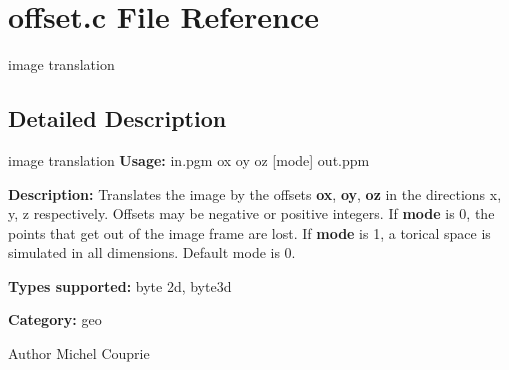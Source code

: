\section{offset.c File Reference}
\label{offset_8c}


image translation  




\subsection{Detailed Description}
image translation {\bfseries Usage:} in.pgm ox oy oz [mode] out.ppm

{\bfseries Description:} Translates the image by the offsets {\bfseries ox}, {\bfseries oy}, {\bfseries oz} in the directions x, y, z respectively. Offsets may be negative or positive integers. If {\bfseries mode} is 0, the points that get out of the image frame are lost. If {\bfseries mode} is 1, a torical space is simulated in all dimensions. Default mode is 0.

{\bfseries Types supported:} byte 2d, byte3d

{\bfseries Category:} geo

\begin{DoxyAuthor}{Author}
Michel Couprie 
\end{DoxyAuthor}
